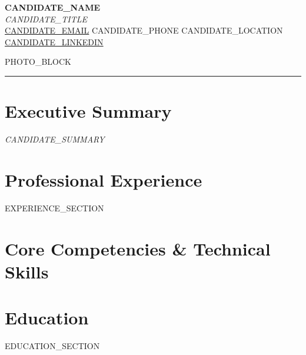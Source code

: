 \documentclass[10pt,a4paper]{article}
\begin{document}
\pagestyle{empty}

\begin{center}
  {\LARGE\bfseries\color{darkgray} {{CANDIDATE_NAME}}}\\[2pt]
  {\small\textit{\color{maincolor} {{CANDIDATE_TITLE}}}}\\[3pt]
  \color{medgray}\scriptsize
  \href{mailto:{{CANDIDATE_EMAIL}}}{{{CANDIDATE_EMAIL}}}
  \enspace\textbullet\enspace
  {{CANDIDATE_PHONE}}
  \enspace\textbullet\enspace
  {{CANDIDATE_LOCATION}}
  \ifx{}\else
    \\[2pt]
    \href{{{CANDIDATE_LINKEDIN_URL}}}{{{CANDIDATE_LINKEDIN}}}
  \fi
\end{center}

\ifx{}\else
  \begin{flushright}
    \vspace{-2.5cm}
    {{PHOTO_BLOCK}}
  \end{flushright}
\fi

\noindent\color{darkgray}\rule{\textwidth}{0.6pt}
\vspace{1pt}

\ifx{}\empty\else
\section{Executive Summary}
\noindent\textit{{{CANDIDATE_SUMMARY}}}
\fi

\section{Professional Experience}
{{EXPERIENCE_SECTION}}

\section{Core Competencies \& Technical Skills}

\section{Education}
{{EDUCATION_SECTION}}
\end{document}
